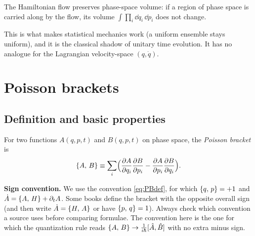 \documentclass[11pt]{article}
\begin{document}
\begin{theorem}[Liouville]
The Hamiltonian flow preserves phase-space volume: if a region of phase space is carried along by the flow, its volume $\int\prod_i\dd q_i\,\dd p_i$ does not change.
\end{theorem}

This is what makes statistical mechanics work (a uniform ensemble stays uniform), and it is the classical shadow of unitary time evolution. It has no analogue for the Lagrangian velocity-space $(q,\dot q)$.

\section{Poisson brackets}

\subsection{Definition and basic properties}

\begin{definition}
For two functions $A(q,p,t)$ and $B(q,p,t)$ on phase space, the \emph{Poisson bracket} is
\begin{equation}
 \left\{A,\,B\right\}\equiv\sum_i\Bigl(\frac{\partial A}{\partial q_i}\frac{\partial B}{\partial p_i}-\frac{\partial A}{\partial p_i}\frac{\partial B}{\partial q_i}\Bigr).
\label{eq:PBdef}
\end{equation}
\end{definition}

\begin{pitfall}
\textbf{Sign convention.} We use the convention \eqref{eq:PBdef}, for which $\left\{q,\,p\right\}=+1$ and $\dot A=\left\{A,\,H\right\}+\partial_tA$. Some books define the bracket with the opposite overall sign (and then write $\dot A=\left\{H,\,A\right\}$ or have $\left\{p,\,q\right\}=1$). Always check which convention a source uses before comparing formulae. The convention here is the one for which the quantization rule reads $\left\{A,\,B\right\}\to\frac1{i\hbar}[\hat A,\hat B]$ with no extra minus sign.
\end{pitfall}
\end{document}
